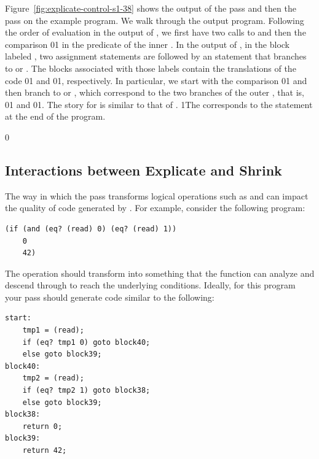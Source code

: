 \documentclass[7x10]{TimesAPriori_MIT}%
\def\racketEd{0}
\def\pythonEd{1}
\def\edition{0}
\newcommand{\racket}[1]{{\if\edition\racketEd{#1}\fi}}
\newcommand{\python}[1]{{\if\edition\pythonEd #1\fi}}
\numberwithin{theorem}{chapter}
\numberwithin{definition}{chapter}
\numberwithin{equation}{chapter}
\begin{document}
Figure~\ref{fig:explicate-control-s1-38} shows the output of the
 pass and then the
 pass on the example program. We walk through
the output program.
%
Following the order of evaluation in the output of
, we first have two calls to \CREAD{}
and then the comparison \racket{}\python{}
in the predicate of the inner .  In the output of
, in the
block labeled , two assignment statements are followed by an
 statement that branches to  or
. The blocks associated with those labels contain the
translations of the code
\racket{}\python{}
and
\racket{}\python{},
respectively.  In particular, we start  with the
comparison
\racket{}\python{}
and then branch to  or ,
which correspond to the two branches of the outer , that is,
\racket{}\python{} and
\racket{}\python{}.
%
The story for  is similar to that of .
%
\python{The  corresponds to the  statement
  at the end of the program.}


{\if\edition\racketEd

\subsection{Interactions between Explicate and Shrink}
  
The way in which the  pass transforms logical operations
such as  and  can impact the quality of code
generated by . For example, consider the
following program:
\begin{lstlisting}
(if (and (eq? (read) 0) (eq? (read) 1))
    0
    42)  
\end{lstlisting}
The  operation should transform into something that the
 function can analyze and descend through to
reach the underlying  conditions. Ideally, for this program
your  pass should generate code similar to
the following:
\begin{center}
\begin{minipage}{\textwidth}
\begin{lstlisting}
start:
    tmp1 = (read);
    if (eq? tmp1 0) goto block40;
    else goto block39;
block40:
    tmp2 = (read);
    if (eq? tmp2 1) goto block38;
    else goto block39;
block38:
    return 0;
block39:
    return 42;
\end{lstlisting}
\end{minipage}
\end{center}
\fi}
\end{document}
